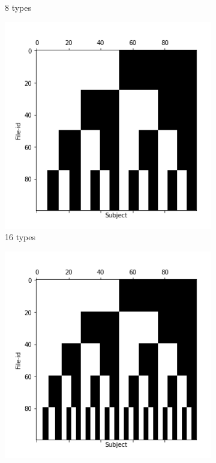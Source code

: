 \documentclass[10pt, conference, compsocconf]{IEEEtran}
\begin{document}
\begin{figure}
\begin{subfigure}[b]{0.45\columnwidth}
                  \caption{8 types}
        \end{subfigure}
                \begin{subfigure}[b]{0.45\columnwidth}
                  \includegraphics[width=\columnwidth]{data/Utility_Matrix/Synthetic/synthetic_subject_types/16_SubjectType_utility_matrix.png}
                  \caption{16 types}
        \end{subfigure}
                \begin{subfigure}[b]{0.45\columnwidth}
                  \includegraphics[width=\columnwidth]{data/Utility_Matrix/Synthetic/synthetic_subject_types/32_SubjectType_utility_matrix.png}

\end{subfigure}
\end{figure}
\end{document}
